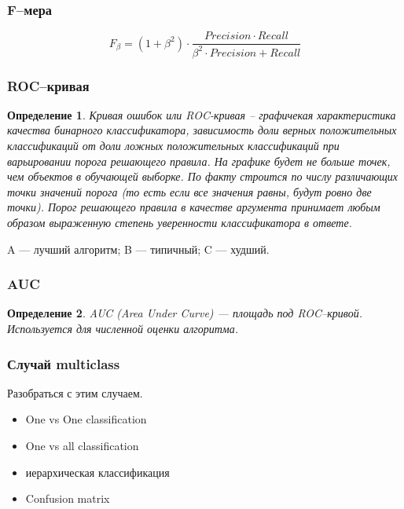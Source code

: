 \documentclass[10pt,a4paper,oneside,titlepage]{report}
\theoremstyle{defenition}
\newtheorem*{defenition}{Определение}
\theoremstyle{theorem}
\begin{document}
\subsubsection{F--мера}

$$
F_{\beta} = (1 + \beta^2)\cdot\frac{Precision\cdot Recall}{\beta^2\cdot Precision + Recall}
$$

\subsubsection{ROC--кривая}

\begin{defenition}
	Кривая ошибок или ROC-кривая – графичекая характеристика качества бинарного классификатора, зависимость доли верных положительных классификаций от доли ложных положительных классификаций при варьировании порога решающего правила. На графике будет не больше точек, чем объектов в обучающей выборке. По факту строится по числу различающих точки значений порога (то есть если все значения равны, будут ровно две точки). Порог решающего правила в качестве аргумента принимает любым образом выраженную степень уверенности классификатора в ответе.
\end{defenition}


A --- лучший алгоритм; B --- типичный; C --- худший.

\subsubsection{AUC}

\begin{defenition}
	AUC (Area Under Curve) --- площадь под ROC--кривой. Используется для численной оценки алгоритма.
\end{defenition}

\subsubsection{Случай multiclass}
Разобраться с этим случаем.
\begin{itemize}
	\item One vs One classification
	\item One vs all classification
	\item иерархическая классификация
	\item Confusion matrix
\end{itemize}
\end{document}
